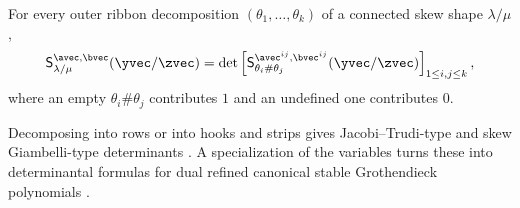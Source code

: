 \begin{theorem}
For every outer ribbon decomposition $(\theta_1,\dotsc,\theta_k)$ of a
connected skew shape $\lambda/\mu$,
\[
  \mathsf{S}^{\avec,\bvec}_{\lambda/\mu}(\yvec/\zvec)
  =\det\left[\mathsf{S}^{\avec^{ij},\bvec^{ij}}_{\theta_i\#\theta_j}(\yvec/\zvec)\right]_{1\leq i,j\leq k},
\]
where an empty $\theta_i\#\theta_j$ contributes $1$ and an undefined one
contributes $0$.
\end{theorem}

Decomposing into rows or into hooks and strips gives Jacobi--Trudi-type and
skew Giambelli-type determinants
\cite[Cor.~7.1 and Cor.~7.3]{AdilzhanYeliussizov2025x}.  A specialization of
the variables turns these into determinantal formulas for dual refined
canonical stable Grothendieck polynomials
\cite[Prop.~3.5 and Cor.~5.11]{AdilzhanYeliussizov2025x}.

